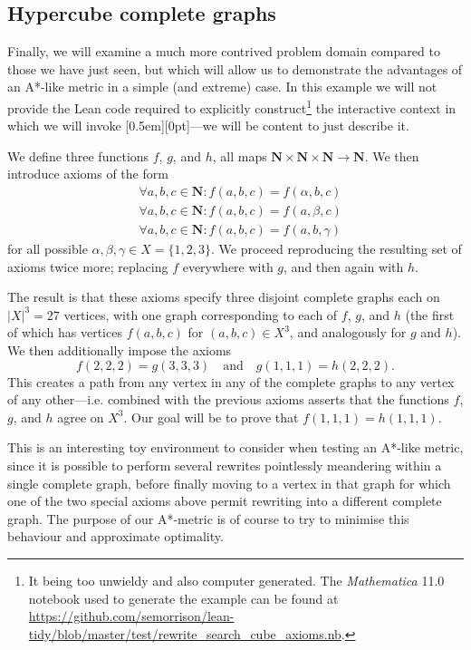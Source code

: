 \documentclass[a4paper]{article}
\newcommand{\NN}{\mathbf{N}}
\theoremstyle{plain}
\theoremstyle{definition}
\newcommand{\xx}[1]{{\colorbox{gray!15}{\raisebox{0em}[0.5em][0pt]{\makebox[\width-0.4em]{\texttt{#1}}}}}}
\begin{document}
\subsection{Hypercube complete graphs}

Finally, we will examine a much more contrived problem domain compared to those we have just seen, but which will allow us to demonstrate the advantages of an A*-like metric in a simple (and extreme) case. In this example we will not provide the Lean code required to explicitly construct\footnote{It being too unwieldy and also computer generated. The \textit{Mathematica}\texttrademark{} 11.0 notebook used to generate the example can be found at \url{https://github.com/semorrison/lean-tidy/blob/master/test/rewrite_search_cube_axioms.nb}.} the interactive context in which we will invoke \xx{rewrite\_search}---we will be content to just describe it.

We define three functions $f$, $g$, and $h$, all maps $\NN \times \NN \times \NN \to \NN$. We then introduce axioms of the form
\begin{align*}
  &\forall a, b, c \in \NN : f(a, b, c) = f(\alpha, b, c)\\
  &\forall a, b, c \in \NN : f(a, b, c) = f(a, \beta, c)\\
  &\forall a, b, c \in \NN : f(a, b, c) = f(a, b, \gamma)
\end{align*}
for all possible $\alpha, \beta, \gamma \in X = \{1, 2, 3\}$. We proceed reproducing the resulting set of axioms twice more; replacing $f$ everywhere with $g$, and then again with $h$.

The result is that these axioms specify three disjoint complete graphs each on $\lvert X \rvert^3 = 27$ vertices, with one graph corresponding to each of $f$, $g$, and $h$ (the first of which has vertices $f(a, b, c)$ for $(a, b, c) \in X^3$, and analogously for $g$ and $h$). We then additionally impose the axioms
\begin{equation*}
f(2,2,2) = g(3,3,3) \quad \text{and} \quad g(1,1,1) = h(2,2,2).
\end{equation*}
This creates a path from any vertex in any of the complete graphs to any vertex of any other---i.e. combined with the previous axioms asserts that the functions $f$, $g$, and $h$ agree on $X^3$. Our goal will be to prove that $f(1,1,1) = h(1,1,1)$.

This is an interesting toy environment to consider when testing an A*-like metric, since it is possible to perform several rewrites pointlessly meandering within a single complete graph, before finally moving to a vertex in that graph for which one of the two special axioms above permit rewriting into a different complete graph. The purpose of our A*-metric is of course to try to minimise this behaviour and approximate optimality.
\end{document}
